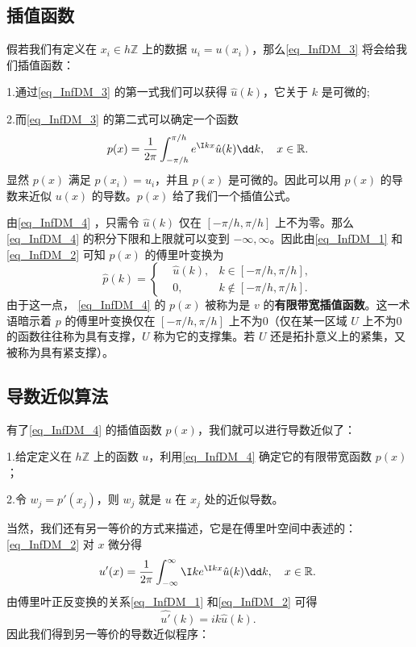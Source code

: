 \subsection{插值函数}
假若我们有定义在 $x_i\in h\mathbb Z$ 上的数据 $u_i=u(x_i)$，那么\autoref{eq_InfDM_3} 将会给我们插值函数：

1.通过\autoref{eq_InfDM_3} 的第一式我们可以获得 $\hat u(k)$，它关于 $k$ 是可微的;

2.而\autoref{eq_InfDM_3} 的第二式可以确定一个函数 
\begin{equation}\label{eq_InfDM_4}
p(x)=\frac{1}{2\pi}\int_{-\pi/h}^{\pi/h} e^{\I kx}\hat u(k)\dd k,\quad x\in \mathbb R.~
\end{equation}
显然 $p(x)$ 满足 $p(x_i)=u_i$，并且 $p(x)$ 是可微的。因此可以用 $p(x)$ 的导数来近似 $u(x)$ 的导数。$p(x)$ 给了我们一个插值公式。

由\autoref{eq_InfDM_4} ，只需令 $\hat u(k)$ 仅在 $[-\pi/h,\pi/h]$ 上不为零。那么\autoref{eq_InfDM_4} 的积分下限和上限就可以变到 $-\infty,\infty$。因此由\autoref{eq_InfDM_1} 和\autoref{eq_InfDM_2} 可知 $p(x)$ 的傅里叶变换为
\begin{equation}
\hat p(k)=\left\{\begin{aligned}
&\hat u(k),&k\in[-\pi/h,\pi/h],\\
&0,&k\not\in[-\pi/h,\pi/h].
\end{aligned}\right.~
\end{equation}
由于这一点， \autoref{eq_InfDM_4} 的  $p(x)$ 被称为是 $v$ 的\textbf{有限带宽插值函数}。这一术语暗示着 $p$ 的傅里叶变换仅在 $[-\pi/h,\pi/h]$ 上不为0（仅在某一区域 $U$ 上不为0的函数往往称为具有支撑，$U$ 称为它的支撑集。若 $U$ 还是拓扑意义上的紧集，又被称为具有紧支撑）。

\subsection{导数近似算法}
有了\autoref{eq_InfDM_4} 的插值函数 $p(x)$，我们就可以进行导数近似了：

1.给定定义在 $h\mathbb Z$ 上的函数 $u$，利用\autoref{eq_InfDM_4} 确定它的有限带宽函数 $p(x)$；

2.令 $w_j=p'(x_j)$，则 $w_j$ 就是 $u$ 在 $x_j$ 处的近似导数。

当然，我们还有另一等价的方式来描述，它是在傅里叶空间中表述的：\autoref{eq_InfDM_2}  对 $x$ 微分得
\begin{equation}
u'(x)=\frac{1}{2\pi}\int_{-\infty}^{\infty} \I ke^{\I kx}\hat u(k)\dd k,\quad x\in \mathbb R.~
\end{equation}
由傅里叶正反变换的关系\autoref{eq_InfDM_1} 和\autoref{eq_InfDM_2} 可得
\begin{equation}
\hat{u'}(k)=ik\hat u(k).~
\end{equation}
因此我们得到另一等价的导数近似程序：

